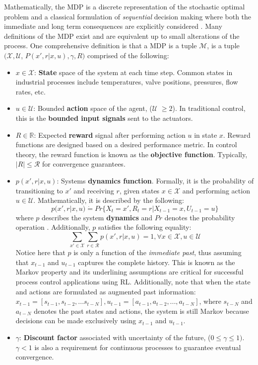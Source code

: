 Mathematically, the MDP is a discrete representation of the stochastic optimal problem and a classical formulation of \textit{sequential} decision making where both the immediate and long term consequences are explicitly considered \cite{bellman1, mdp_bellman}. Many definitions of the MDP exist and are equivalent up to small alterations of the process.  One comprehensive definition is that a MDP is a tuple $\mathcal{M}$, is a tuple $(\mathcal{X}, \mathcal{U}$, $P(x', r|x, u), \gamma, R)$ comprised of the following\cite{ng_ref12}:
\begin{itemize}
    \item $x \in \mathcal{X}$: \textbf{State} space of the system at each time step. Common states in industrial processes include temperatures, valve positions, pressures, flow rates, etc.
    \item $u \in \mathcal{U}$: Bounded \textbf{action} space of the agent, ($\mathcal{U}$ $ \geq 2 $). In traditional control, this is the \textbf{bounded input signals} sent to the actuators.
    \item $R \in \mathbb{R}$: Expected \textbf{reward} signal after performing action $u$ in state $x$. Reward functions are designed based on a desired performance metric.  In control theory, the reward function is known as the \textbf{objective function}.  Typically, $|R| \leq \mathcal{R}$ for convergence guarantees.
    \item $p(x', r|x, u)$: Systems \textbf{dynamics function}. Formally, it is the probability of transitioning to $x'$ and receiving $r$,  given states $x \in \mathcal{X}$ and performing action $u \in \mathcal{U}$. Mathematically, it is described by the following:
    \begin{equation}
        p(x', r | x, u) \dot{=} Pr\{X_t = x', R_t = r | X_{t - 1} = x, U_{t-1} = u\}
        \label{eq:transition_prob}
    \end{equation}
    where $p$ describes the system \textbf{dynamics} and $Pr$ denotes the probability operation \cite{sutton}. Additionally, $p$ satisfies the following equality:
    \begin{equation}
        \sum\limits_{x' \in \mathcal{X}} \sum\limits_{r \in \mathcal{R}} p(x', r | x, u) = 1, \forall x \in \mathcal{X}, u \in \mathcal{U}
        \label{eq:prob}
    \end{equation}
    Notice here that $p$ is only a function of the \textit{immediate past}, thus assuming that $x_{t - 1}$ and $u_{t-1}$ captures the complete history. This is known as the Markov property and its underlining assumptions are critical for successful process control applications using RL. Additionally, note that when the state and actions are formulated as augmented past information: $x_{t-1} = [s_{t-1}, s_{t-2}, ... s_{t-N}], u_{t-1} = [a_{t-1}, a_{t-2}, ..., a_{t-N}]$, where $s_{t-N}$ and $a_{t-N}$ denotes the past states and actions, the system is still Markov because decisions can be made exclusively using $x_{t-1}$ and $u_{t-1}$. 
    \item $\gamma$: \textbf{Discount factor} associated with uncertainty of the future, ($0 \leq \gamma \leq 1)$. $\gamma < 1$ is also a requirement for continuous processes to guarantee eventual convergence.
\end{itemize}

